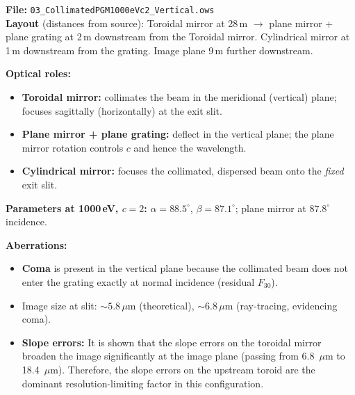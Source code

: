 \documentclass[12pt,a4paper]{article}
\newcommand{\placeholder}[4][\linewidth]{%
  \begin{figure}[H]
    \centering
    \begin{tikzpicture}
      \draw[fill=plbg, draw=plframe, line width=1pt, dashed]
            (0,0) rectangle (#1, #2);
      \draw[plframe, line width=0.4pt] (0,0) -- (#1,#2);
      \draw[plframe, line width=0.4pt] (#1,0) -- (0,#2);
      \node[anchor=north west, font=\small\bfseries\color{plframe},
            inner sep=4pt] at (0,#2) {#3};
      \node[anchor=center, font=\small\itshape\color{pltext},
            text width=0.75\linewidth, align=center]
            at ({0.5*#1},{0.5*#2}) {#4};
    \end{tikzpicture}
  \end{figure}
}
\newcommand{\al}{\alpha}
\newcommand{\be}{\beta}
\begin{document}
\begin{exbox}
\textbf{File:} \texttt{03\_CollimatedPGM1000eVc2\_Vertical.ows}\\[4pt]
\textbf{Layout} (distances from source): Toroidal mirror at 28\,m $\to$ plane mirror +
plane grating at 2\,m downstream from the Toroidal mirror. Cylindrical mirror at 1\,m downstream from the grating. Image plane 9\,m further downstream. 

\medskip
\textbf{Optical roles:}
\begin{itemize}
  \item \textbf{Toroidal mirror:} collimates the beam in the meridional (vertical) plane;
        focuses sagittally (horizontally) at the exit slit.
  \item \textbf{Plane mirror + plane grating:} deflect in the vertical plane; the plane
        mirror rotation controls $c$ and hence the wavelength.
  \item \textbf{Cylindrical mirror:} focuses the collimated, dispersed beam onto the
        \emph{fixed} exit slit.
\end{itemize}

\medskip
\textbf{Parameters at 1000\,eV, $c = 2$:} $\al = 88.5^\circ$, $\be = 87.1^\circ$; plane mirror at
$87.8^\circ$ incidence.

\medskip
\textbf{Aberrations:}
\begin{itemize}
  \item \textbf{Coma} is present in the vertical plane because the collimated beam does
        not enter the grating exactly at normal incidence (residual $F_{30}$).
  \item Image size at slit: $\sim 5.8\,\mu$m (theoretical), $\sim 6.8\,\mu$m (ray-tracing, evidencing coma).
  \item \textbf{Slope errors:} It is shown that the slope errors on the toroidal mirror broaden the image significantly at the image plane (passing from 6.8~$\mu$m to 18.4~$\mu$m).
  Therefore, the slope errors on the upstream toroid are the dominant resolution-limiting factor in this configuration.
\end{itemize}
\end{exbox}

\end{document}
